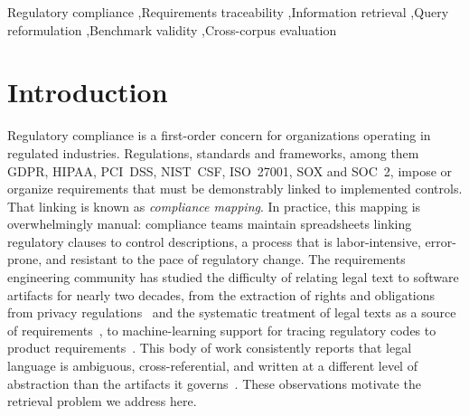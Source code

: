 \documentclass[a4paper,fleqn]{cas-sc}
\begin{document}
\begin{keywords}
Regulatory compliance \sep Requirements traceability \sep Information retrieval \sep Query reformulation \sep Benchmark validity \sep Cross-corpus evaluation
\end{keywords}

\maketitle


\section{Introduction}
\label{sec:intro}

Regulatory compliance is a first-order concern for organizations operating in regulated industries.
Regulations, standards and frameworks, among them GDPR, HIPAA, PCI~DSS, NIST~CSF, ISO~27001, SOX and SOC~2, impose or organize requirements that must be demonstrably linked to implemented controls. That linking is known as \emph{compliance mapping}.
In practice, this mapping is overwhelmingly manual: compliance teams maintain spreadsheets linking regulatory clauses to control descriptions, a process that is labor-intensive, error-prone, and resistant to the pace of regulatory change.
The requirements engineering community has studied the difficulty of relating legal text to software artifacts for nearly two decades, from the extraction of rights and obligations from privacy regulations~\citep{Breaux2008} and the systematic treatment of legal texts as a source of requirements~\citep{OttoAnton2007}, to machine-learning support for tracing regulatory codes to product requirements~\citep{ClelandHuang2010}.
This body of work consistently reports that legal language is ambiguous, cross-referential, and written at a different level of abstraction than the artifacts it governs~\citep{Massey2010,Zeni2015}. These observations motivate the retrieval problem we address here.
\end{document}
